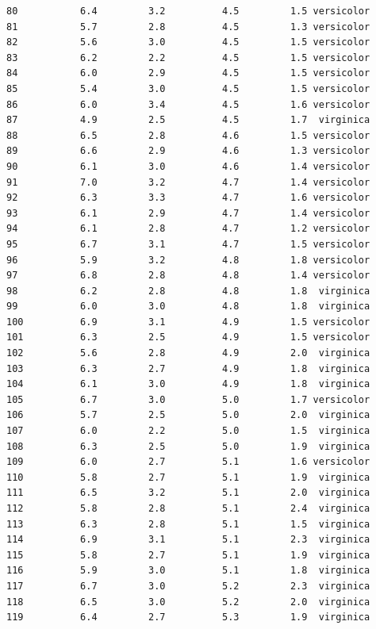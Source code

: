 \documentclass[
  letterpaper,
  DIV=11,
  numbers=noendperiod]{scrartcl}
\begin{document}
\begin{verbatim}
80           6.4         3.2          4.5         1.5 versicolor
81           5.7         2.8          4.5         1.3 versicolor
82           5.6         3.0          4.5         1.5 versicolor
83           6.2         2.2          4.5         1.5 versicolor
84           6.0         2.9          4.5         1.5 versicolor
85           5.4         3.0          4.5         1.5 versicolor
86           6.0         3.4          4.5         1.6 versicolor
87           4.9         2.5          4.5         1.7  virginica
88           6.5         2.8          4.6         1.5 versicolor
89           6.6         2.9          4.6         1.3 versicolor
90           6.1         3.0          4.6         1.4 versicolor
91           7.0         3.2          4.7         1.4 versicolor
92           6.3         3.3          4.7         1.6 versicolor
93           6.1         2.9          4.7         1.4 versicolor
94           6.1         2.8          4.7         1.2 versicolor
95           6.7         3.1          4.7         1.5 versicolor
96           5.9         3.2          4.8         1.8 versicolor
97           6.8         2.8          4.8         1.4 versicolor
98           6.2         2.8          4.8         1.8  virginica
99           6.0         3.0          4.8         1.8  virginica
100          6.9         3.1          4.9         1.5 versicolor
101          6.3         2.5          4.9         1.5 versicolor
102          5.6         2.8          4.9         2.0  virginica
103          6.3         2.7          4.9         1.8  virginica
104          6.1         3.0          4.9         1.8  virginica
105          6.7         3.0          5.0         1.7 versicolor
106          5.7         2.5          5.0         2.0  virginica
107          6.0         2.2          5.0         1.5  virginica
108          6.3         2.5          5.0         1.9  virginica
109          6.0         2.7          5.1         1.6 versicolor
110          5.8         2.7          5.1         1.9  virginica
111          6.5         3.2          5.1         2.0  virginica
112          5.8         2.8          5.1         2.4  virginica
113          6.3         2.8          5.1         1.5  virginica
114          6.9         3.1          5.1         2.3  virginica
115          5.8         2.7          5.1         1.9  virginica
116          5.9         3.0          5.1         1.8  virginica
117          6.7         3.0          5.2         2.3  virginica
118          6.5         3.0          5.2         2.0  virginica
119          6.4         2.7          5.3         1.9  virginica

\end{verbatim}
\end{document}
